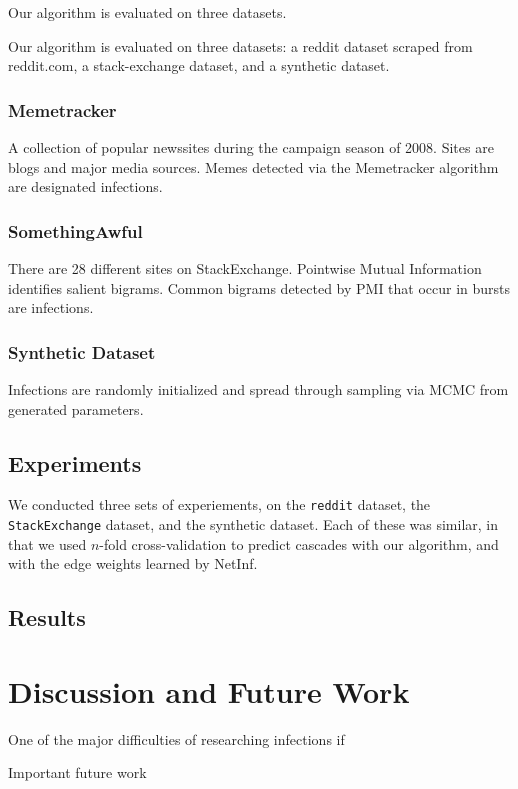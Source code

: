 \documentclass{article} %
\begin{document}
Our algorithm is evaluated on three datasets.

Our algorithm is evaluated on three datasets: a reddit dataset scraped from reddit.com, a stack-exchange dataset, and a synthetic dataset.

\subsubsection{Memetracker}

A collection of popular newssites during the campaign season of 2008. Sites are blogs and major media sources. Memes detected via the Memetracker algorithm \cite{memetracker} are designated infections.

\subsubsection{SomethingAwful}
 There are 28 different sites on StackExchange. Pointwise Mutual Information \cite{pmi} identifies salient bigrams. Common bigrams detected by PMI that occur in bursts are infections.
\subsubsection{Synthetic Dataset}
Infections are randomly initialized and spread through sampling via MCMC from generated parameters.

\subsection{Experiments}
\label{experiments}

We conducted three sets of experiements, on the \texttt{reddit} dataset, the \texttt{StackExchange} dataset, and the synthetic dataset. Each of these was similar, in that we used $n$-fold cross-validation to predict cascades with our algorithm, and with the edge weights learned by NetInf.

\subsection{Results}
\label{results}



\section{Discussion and Future Work}
\label{discussion}

One of the major difficulties of researching infections if 

Important future work 

{}
\label{refs}

\end{document}

